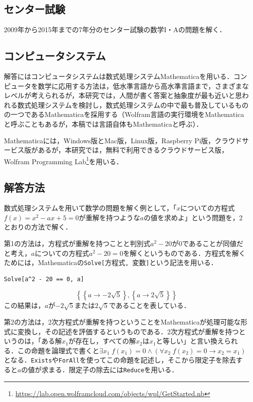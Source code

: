 \documentclass[uplatex,twocolumn]{jsarticle}
\begin{document}
\subsection{センター試験}

2009年から2015年までの7年分のセンター試験の数学I・Aの問題を解く．

\subsection{コンピュータシステム}

解答にはコンピュータシステムは数式処理システムMathematicaを用いる．コンピュータを数学に応用する方法は，低水準言語から高水準言語まで，さまざまなレベルが考えられるが，本研究では，人間が書く答案と抽象度が最も近いと思われる数式処理システムを検討し，数式処理システムの中で最も普及しているものの一つであるMathematicaを採用する（Wolfram言語の実行環境をMathematicaと呼ぶこともあるが，本稿では言語自体もMathematicaと呼ぶ）．

Mathematicaには，Windows版とMac版，Linux版，Raspberry Pi版，クラウドサービス版があるが，本研究では，無料で利用できるクラウドサービス版，Wolfram Programming Lab\footnote{\url{https://lab.open.wolframcloud.com/objects/wpl/GetStarted.nb}}を用いる．

\subsection{解答方法}

数式処理システムを用いて数学の問題を解く例として，「$x$についての方程式$f(x)=x^2-ax+5=0$が重解を持つような$a$の値を求めよ」という問題を，2とおりの方法で解く．

第1の方法は，方程式が重解を持つことと判別式$a^2-20$が$0$であることが同値だと考え，$a$についての方程式$a^2-20=0$を解くというものである．方程式を解くためには，Mathematicaの\verb|Solve[|方程式\verb|, |変数\verb|]|という記法を用いる\cite{wolfram2014}．

\begin{verbatim}
Solve[a^2 - 20 == 0, a]
\end{verbatim}
\vspace{-5mm}\[\left\{\left\{a\to -2 \sqrt{5}\right\},\left\{a\to 2 \sqrt{5}\right\}\right\}\]
この結果は，$a$が$-2\sqrt{5}$または$2\sqrt{5}$であることを表している．

第2の方法は，2次方程式が重解を持つということをMathematicaが処理可能な形式に変換し，その記述を評価するというものである．2次方程式が重解を持つというのは，「ある解$x_1$が存在し，すべての解$x_2$は$x_1$と等しい」と言い換えられる．この命題を論理式で書くと$\exists x_1\;f(x_1)=0\land\left(\forall x_2\;f(x_2)=0\to x_2=x_1\right)$となる．\verb|Exists|や\verb|ForAll|を使ってこの命題を記述し，そこから限定子を除去すると$a$の値が求まる．限定子の除去には\verb|Reduce|を用いる．
\end{document}
